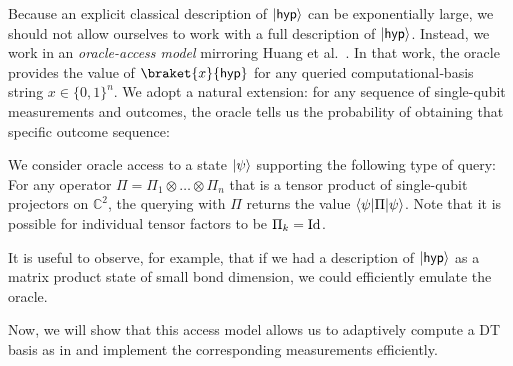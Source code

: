 Because an explicit classical description of $\lvert\mathsf{hyp}\rangle$ can be exponentially large, we should not allow ourselves to work with a full description of $\lvert\mathsf{hyp}\rangle$. Instead, we work in an \emph{oracle-access model} mirroring Huang et al.~\cite{huang2024certifying}. In that work, the oracle provides the value of $\braket{x}{\tar}$ for any queried computational‑basis string $x\in\{0,1\}^{n}$.  We adopt a natural extension: for any sequence of single-qubit measurements and outcomes, the oracle tells us the probability of obtaining that specific outcome sequence:


\begin{definition}\label{def:access model}
We consider oracle access to a state
$\lvert\psi\rangle$  supporting the following type of query: For any operator $\Pi=\Pi_1\otimes\dots\otimes \Pi_n$ that is a tensor product of single-qubit projectors on $\mathbb{C}^{2}$, the querying with $\Pi$ returns the value $\langle\psi\rvert \Pi \lvert\psi\rangle$. Note that it is possible for individual tensor factors to be $\Pi_k=\mathrm{Id}$.
\end{definition}

It is useful to observe, for example, that if we had a description of $\lvert\mathsf{hyp}\rangle$ as a matrix product state of small bond dimension, we could efficiently emulate the oracle.

Now, we will show that this access model allows us to adaptively compute a DT basis as in  and implement the corresponding measurements efficiently.%


